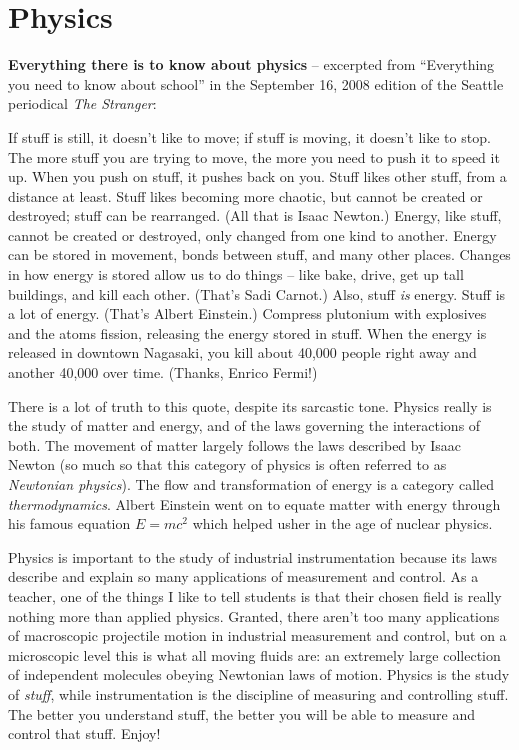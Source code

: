 
\chapter{Physics}

\noindent
\textbf{Everything there is to know about physics} -- excerpted from ``Everything you need to know about school'' in the September 16, 2008 edition of the Seattle periodical \textit{The Stranger}:

\vskip 10pt {\narrower \noindent \baselineskip5pt

If stuff is still, it doesn't like to move; if stuff is moving, it doesn't like to stop.  The more stuff you are trying to move, the more you need to push it to speed it up.  When you push on stuff, it pushes back on you.  Stuff likes other stuff, from a distance at least.  Stuff likes becoming more chaotic, but cannot be created or destroyed; stuff can be rearranged.  (All that is Isaac Newton.)  Energy, like stuff, cannot be created or destroyed, only changed from one kind to another.  Energy can be stored in movement, bonds between stuff, and many other places.  Changes in how energy is stored allow us to do things -- like bake, drive, get up tall buildings, and kill each other.  (That's Sadi Carnot.)  Also, stuff \textit{is} energy.  Stuff is a lot of energy.  (That's Albert Einstein.)  Compress plutonium with explosives and the atoms fission, releasing the energy stored in stuff.  When the energy is released in downtown Nagasaki, you kill about 40,000 people right away and another 40,000 over time.  (Thanks, Enrico Fermi!)

\par} \vskip 10pt

\vskip 10pt

There is a lot of truth to this quote, despite its sarcastic tone.  Physics really is the study of matter and energy, and of the laws governing the interactions of both.  The movement of matter largely follows the laws described by Isaac Newton (so much so that this category of physics is often referred to as \textit{Newtonian physics}).  The flow and transformation of energy is a category called \textit{thermodynamics}.  Albert Einstein went on to equate matter with energy through his famous equation $E = mc^2$ which helped usher in the age of nuclear physics.

Physics is important to the study of industrial instrumentation because its laws describe and explain so many applications of measurement and control.  As a teacher, one of the things I like to tell students is that their chosen field is really nothing more than applied physics.  Granted, there aren't too many applications of macroscopic projectile motion in industrial measurement and control, but on a microscopic level this is what all moving fluids are: an extremely large collection of independent molecules obeying Newtonian laws of motion.  Physics is the study of \textit{stuff}, while instrumentation is the discipline of measuring and controlling stuff.  The better you understand stuff, the better you will be able to measure and control that stuff.  Enjoy!







